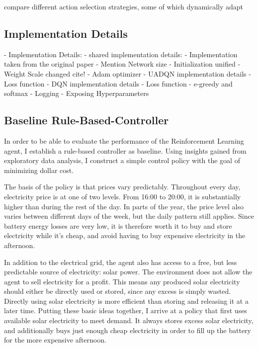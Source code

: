     \cite{cruz2018ActionSelectionMethods} compare different action selection strategies, some of which dynamically adapt 

\subsection{Implementation Details}
- Implementation Details:
    - shared implementation details:
        - Implementation taken from the original paper
        - Mention Network size
        - Initialization unified
        - Weight Scale changed cite!
        - Adam optimizer
    - UADQN implementation details
        - Loss function
    - DQN implementation details
        - Loss function
        - e-greedy and softmax
    - Logging
    - Exposing Hyperparameters



\subsection{Baseline Rule-Based-Controller}
In order to be able to evaluate the performance of the Reinforcement Learning agent, I establish a rule-based controller as baseline.
Using insights gained from exploratory data analysis, I construct a simple control policy with the goal of minimizing dollar cost.

The basis of the policy is that prices vary predictably.
Throughout every day, electricity price is at one of two levels.
From 16:00 to 20:00, it is substantially higher than during the rest of the day.
In parts of the year, the price level also varies between different days of the week, but the daily pattern still applies.
Since battery energy losses are very low, it is therefore worth it to buy and store electricity while it's cheap, and avoid having to buy expensive electricity in the afternoon.

In addition to the electrical grid, the agent also has access to a free, but less predictable source of electricity: solar power.
The environment does not allow the agent to sell electricity for a profit.
This means any produced solar electricity should either be directly used or stored, since any excess is simply wasted. Directly using solar electricity is more efficient than storing and releasing it at a later time.
Putting these basic ideas together, I arrive at a policy that first uses available solar electricity to meet demand.
It always stores excess solar electricity, and additionally buys just enough cheap electricity in order to fill up the battery for the more expensive afternoon.


